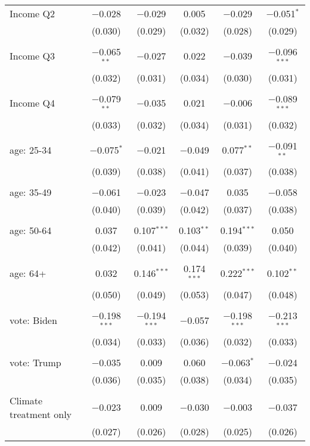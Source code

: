 \begin{tabular}{@{\extracolsep{5pt}}lccccc}
 Income Q2 & $-$0.028 & $-$0.029 & 0.005 & $-$0.029 & $-$0.051$^{*}$ \\ 
  & (0.030) & (0.029) & (0.032) & (0.028) & (0.029) \\ 
  & & & & & \\ 
 Income Q3 & $-$0.065$^{**}$ & $-$0.027 & 0.022 & $-$0.039 & $-$0.096$^{***}$ \\ 
  & (0.032) & (0.031) & (0.034) & (0.030) & (0.031) \\ 
  & & & & & \\ 
 Income Q4 & $-$0.079$^{**}$ & $-$0.035 & 0.021 & $-$0.006 & $-$0.089$^{***}$ \\ 
  & (0.033) & (0.032) & (0.034) & (0.031) & (0.032) \\ 
  & & & & & \\ 
 age: 25-34 & $-$0.075$^{*}$ & $-$0.021 & $-$0.049 & 0.077$^{**}$ & $-$0.091$^{**}$ \\ 
  & (0.039) & (0.038) & (0.041) & (0.037) & (0.038) \\ 
  & & & & & \\ 
 age: 35-49 & $-$0.061 & $-$0.023 & $-$0.047 & 0.035 & $-$0.058 \\ 
  & (0.040) & (0.039) & (0.042) & (0.037) & (0.038) \\ 
  & & & & & \\ 
 age: 50-64 & 0.037 & 0.107$^{***}$ & 0.103$^{**}$ & 0.194$^{***}$ & 0.050 \\ 
  & (0.042) & (0.041) & (0.044) & (0.039) & (0.040) \\ 
  & & & & & \\ 
 age: 64+ & 0.032 & 0.146$^{***}$ & 0.174$^{***}$ & 0.222$^{***}$ & 0.102$^{**}$ \\ 
  & (0.050) & (0.049) & (0.053) & (0.047) & (0.048) \\ 
  & & & & & \\ 
 vote: Biden & $-$0.198$^{***}$ & $-$0.194$^{***}$ & $-$0.057 & $-$0.198$^{***}$ & $-$0.213$^{***}$ \\ 
  & (0.034) & (0.033) & (0.036) & (0.032) & (0.033) \\ 
  & & & & & \\ 
 vote: Trump & $-$0.035 & 0.009 & 0.060 & $-$0.063$^{*}$ & $-$0.024 \\ 
  & (0.036) & (0.035) & (0.038) & (0.034) & (0.035) \\ 
  & & & & & \\ 
 Climate treatment only & $-$0.023 & 0.009 & $-$0.030 & $-$0.003 & $-$0.037 \\ 
  & (0.027) & (0.026) & (0.028) & (0.025) & (0.026) \\ 

\end{tabular}

